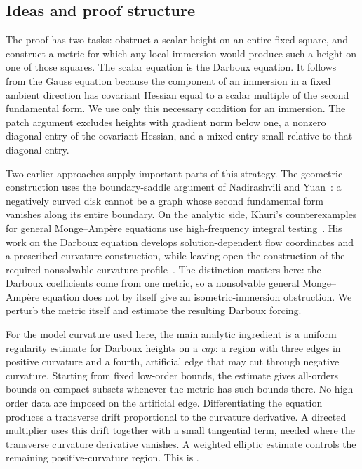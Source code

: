 \documentclass[11pt]{amsart}
\theoremstyle{definition}
\theoremstyle{remark}
\numberwithin{equation}{section}
\begin{document}
\subsection*{Ideas and proof structure}
The proof has two tasks: obstruct a scalar height on an entire fixed
square, and construct a metric for which any local immersion would
produce such a height on one of those squares. The scalar equation
is the Darboux equation. It follows from the Gauss equation because
the component of an immersion in a fixed ambient direction has
covariant Hessian equal to a scalar multiple of the second fundamental
form. We use only this necessary condition for an immersion.
The patch argument excludes heights with gradient norm below one,
a nonzero diagonal entry of the covariant Hessian, and a mixed entry
small relative to that diagonal entry.

Two earlier approaches supply important parts of this strategy.
The geometric construction uses the boundary-saddle argument of
Nadirashvili and Yuan~\cite[Section~2, Step~3]{NY2002}:
a negatively curved disk cannot be a graph whose second fundamental
form vanishes along its entire boundary. On the analytic side,
Khuri's counterexamples for general Monge--Amp\`ere equations use
high-frequency integral testing~\cite{Khuri2007Counterexamples}.
His work on the Darboux equation develops solution-dependent flow
coordinates and a prescribed-curvature construction, while leaving
open the construction of the required nonsolvable curvature
profile~\cite[Theorem~1 and the following discussion]{Khuri2009}.
The distinction matters here: the Darboux coefficients come from
one metric, so a nonsolvable general Monge--Amp\`ere equation does
not by itself give an isometric-immersion obstruction. We perturb
the metric itself and estimate the resulting Darboux forcing.

For the model curvature used here, the main analytic ingredient is
a uniform regularity estimate for Darboux heights on a \emph{cap}:
a region with three edges in positive
curvature and a fourth, artificial edge that may cut through negative
curvature. Starting from fixed low-order bounds, the estimate gives
all-orders bounds on compact subsets whenever the metric has such
bounds there. No high-order data are imposed on the artificial edge.
Differentiating the equation produces a transverse drift proportional
to the curvature derivative. A directed multiplier uses this drift
together with a small tangential term, needed where the transverse
curvature derivative vanishes. A weighted elliptic estimate controls
the remaining positive-curvature region. This is .
\end{document}
